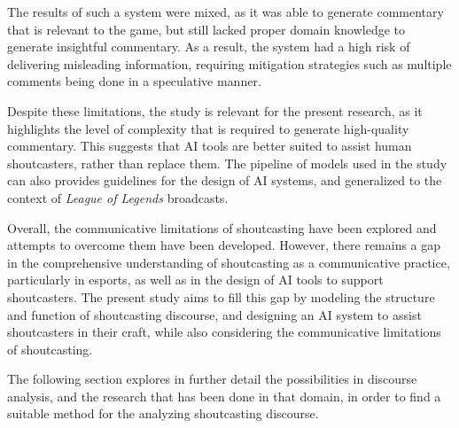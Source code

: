 \medskip

The results of such a system were mixed, as it was able to generate commentary that is relevant to the game, but still lacked proper domain knowledge to generate insightful commentary. As a result, the system had a high risk of delivering misleading information, requiring mitigation strategies such as multiple comments being done in a speculative manner. 

\medskip

Despite these limitations, the study is relevant for the present research, as it highlights the level of complexity that is required to generate high-quality commentary. This suggests that AI tools are better suited to assist human shoutcasters, rather than replace them. The pipeline of models used in the study can also provides guidelines for the design of AI systems, and generalized to the context of \textit{League of Legends} broadcasts.

\medskip

Overall, the communicative limitations of shoutcasting have been explored and attempts to overcome them have been developed. However, there remains a gap in the comprehensive understanding of shoutcasting as a communicative practice, particularly in esports, as well as in the design of AI tools to support shoutcasters. The present study aims to fill this gap by modeling the structure and function of shoutcasting discourse, and designing an AI system to assist shoutcasters in their craft, while also considering the communicative limitations of shoutcasting. 

\medskip

The following section explores in further detail the possibilities in discourse analysis, and the research that has been done in that domain, in order to find a suitable method for the analyzing shoutcasting discourse.